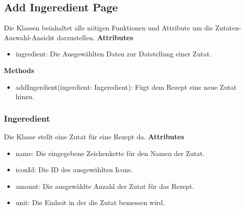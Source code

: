 \documentclass[parskip=full]{scrartcl}
\begin{document}
        

        \newpage
        
        \subsection{Add Ingeredient Page}
            Die Klassen beinhaltet alle nötigen Funktionen und Attribute um die Zutaten-Auswahl-Ansicht darzustellen.\newline
        \textbf{Attributes}
        \begin{itemize}
            \item ingredient: Die Ausgewählten Daten zur Datstellung einer Zutat.
        \end{itemize}
        
        \textbf{Methods}
        \begin{itemize}
            \item addIngerdient(ingerdient: Ingeredient): Fügt dem Rezept eine neue Zutat hinzu. 
        \end{itemize}
        
            \subsubsection{Ingeredient}
                Die Klasse stellt eine Zutat für eine Rezept da.
                \textbf{Attributes}
                    \begin{itemize}
                        \item name: Die eingegebene Zeichenkette für den Namen der Zutat.
                        \item iconId: Die ID des ausgewählten Icons.
                        \item amount: Die ausgewählte Anzahl der Zutat für das Rezept.
                        \item unit: Die Einheit in der die Zutat bemessen wird.
                    \end{itemize}
                    
\end{document}
